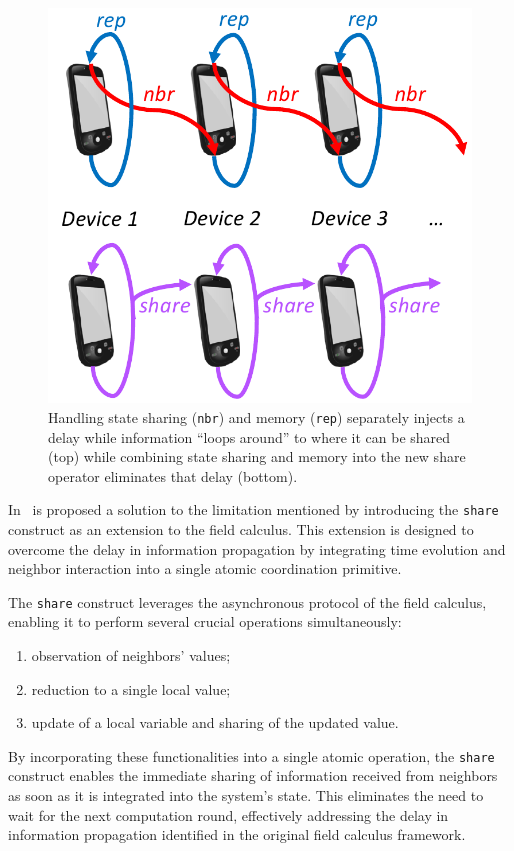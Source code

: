 \begin{figure}[ht!]
    \centering
    \includegraphics[width=.5\linewidth]{figures/state-sharing.png}
    \caption{Handling state sharing (\texttt{nbr}) and memory (\texttt{rep}) separately injects a delay while information ``loops around'' to where it can be shared (top) while combining state sharing and memory into the new share operator eliminates that delay (bottom).}
    \label{fig:handling-state-sharing}
\end{figure}

In~\cite{Audrito2018} is proposed a solution to the limitation mentioned by introducing the \texttt{share} construct as an extension to the field calculus. This extension is designed to overcome the delay in information propagation by integrating time evolution and neighbor interaction into a single atomic coordination primitive.

The \texttt{share} construct leverages the asynchronous protocol of the field calculus, enabling it to perform several crucial operations simultaneously:

\begin{enumerate}
    \item observation of neighbors' values;
    \item reduction to a single local value;
    \item update of a local variable and sharing of the updated value.
\end{enumerate}

By incorporating these functionalities into a single atomic operation, the \texttt{share} construct enables the immediate sharing of information received from neighbors as soon as it is integrated into the system's state. This eliminates the need to wait for the next computation round, effectively addressing the delay in information propagation identified in the original field calculus framework.

